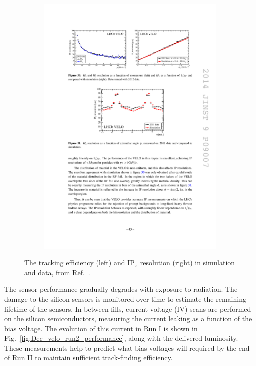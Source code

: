 \begin{figure}[!h]
\begin{subfigure}[t]{0.4\textwidth}
        \includegraphics[width=1.0\textwidth]{figs/Detector/velo_ipx_resolution.pdf}
    \end{subfigure}
    \caption{The tracking efficiency (left) and $\text{IP}_{x}$ resolution (right) in simulation and data, from Ref.~\cite{LHCb-DP-2014-001}.}
    \label{fig:Dec_velo_track_performance}   
\end{figure}

The \velo sensor performance gradually degrades with exposure to radiation. The damage to the silicon sensors is monitored over time to estimate the remaining lifetime of the sensors. In-between \lhc fills, current-voltage (IV) scans are performed on the silicon semiconductors, measuring the current leaking as a function of the bias voltage. The evolution of this current in Run I is shown in Fig.~\ref{fig:Dec_velo_run2_performance}, along with the delivered luminosity. These measurements help to predict what bias voltages will required by the end of Run II to maintain sufficient track-finding efficiency.

